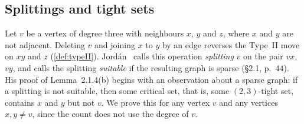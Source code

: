 \subsection{Splittings and tight sets}
\label{sec:isSparse-typeII-reverse-blocker}

Let $v$ be a vertex of degree three with neighbours $x$, $y$ and $z$,
where $x$ and $y$ are not adjacent. Deleting $v$ and joining $x$ to $y$
by an edge reverses the Type~II move on $xy$ and $z$
(\cref{def:typeII}). Jord\'an~\cite{jordan2016} calls this operation
\emph{splitting} $v$ on the pair $vx$, $vy$, and calls the splitting
\emph{suitable} if the resulting graph is sparse (\S 2.1, p.~44). His
proof of Lemma~2.1.4(b) begins with an observation about a sparse
graph: if a splitting is not suitable, then some critical set, that
is, some $(2,3)$-tight set, contains $x$ and $y$ but not $v$. We prove
this for any vertex $v$ and any vertices $x, y \ne v$, since the count
does not use the degree of $v$.

